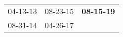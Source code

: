 \begin{supertabular}{p{0.33\columnwidth}p{0.33\columnwidth}p{0.33\columnwidth}}
 04-13-13\textsuperscript{} &  08-23-15\textsuperscript{} &  \textbf{08-15-19\textsuperscript{}} \\
 08-31-14\textsuperscript{} &  04-26-17\textsuperscript{} &                                      \\
\end{supertabular}
